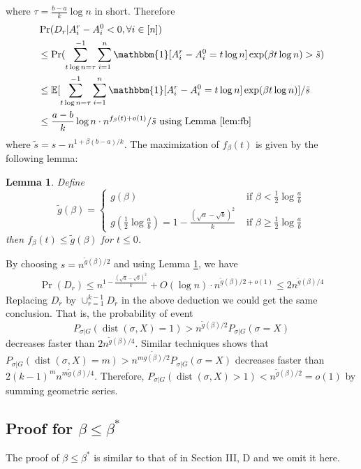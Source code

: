 \documentclass[conference]{IEEEtran}
\newtheorem{lemma}{Lemma}
\DeclareMathOperator{\dist}{dist}
\begin{document}
	where $\tau =\frac{b-a}{k}\log n$ in short. Therefore
	\begin{align*}
	&\Pr(D_r | A_i^r - A_i^0  < 0, \forall i\in [n])  \\
	&\leq\Pr(\sum_{t\log n =\tau}^{-1}\sum_{i=1}^n \mathbbm{1}[A^r_i - A^0_i = t\log n]\exp ( \beta  t\log n)  > \tilde{s} ) \\
	& \leq \mathbb{E}[\sum_{t\log n =\tau}^{-1}\sum_{i=1}^n \mathbbm{1}[A^r_i - A^0_i= t\log n]\exp ( \beta  t\log n)] /  \tilde{s} \\
	& \leq \frac{a-b}{k}\log n \cdot n^{f_{\beta}(t) + o(1)} / \tilde{s} \textrm{ using Lemma \ref{lem:fb} }
	\end{align*}
	where $\tilde{s} = s - n^{1+\beta(b-a)/k}$. 
	The maximization of $f_{\beta}(t)$ is given by the following lemma:
	\begin{lemma}\label{lem:tilde_g}
		Define
		$$
		\tilde{g}(\beta) = \begin{cases}
		g(\beta)   & \text{~if~} \beta< \frac{1}{2}\log\frac{a}{b} \\
		g(\frac{1}{2} \log\frac{a}{b}) = 1 - \frac{(\sqrt{a}-\sqrt{b})^2}{k} & \text{~if~} \beta\ge \frac{1}{2}\log\frac{a}{b}
		\end{cases}
		$$
		then $f_{\beta}(t) \leq \tilde{g}(\beta)$ for $t\leq 0$.
	\end{lemma}
	By choosing $s = n^{\tilde{g}(\beta)/2}$ and using Lemma \ref{lem:tilde_g}, we have
	\begin{align*}
	\Pr( D_r) \leq  n^{1-\frac{(\sqrt{a}-\sqrt{b})^2}{k}} + O(\log n)  \cdot n^{\tilde{g}(\beta)/2 + o(1)} \leq 2n^{\tilde{g}(\beta)/4}
	\end{align*}
	Replacing $D_r$ by $\cup_{r=1}^{k-1} D_r$ in the above deduction we could get the same conclusion.
	That is, the probability of event
	$$
	P_{\sigma | G}(\dist(\sigma, X) = 1) > n^{\tilde{g}(\beta)/2}P_{\sigma | G}(\sigma = X)\label{eq:betastar_xx}
	$$
	decreases faster than $2n^{\tilde{g}(\beta)/4}$.
	Similar techniques shows that $P_{\sigma | G}(\dist(\sigma, X) = m)> n^{m\tilde{g(\beta)}/2}P_{\sigma | G}(\sigma = X)$
	decreases faster than $2(k-1)^m n^{m\tilde{g}(\beta)/4}$. Therefore, $P_{\sigma | G}(\dist(\sigma, X) > 1) < n^{\tilde{g}(\beta)/2} = o(1)$ by summing geometric series.
	
	\subsection{Proof for $\beta\le\beta^\ast$}\label{subsect:smaller}
	The proof of $\beta\le\beta^\ast$ is similar to that of \cite{ye2020exact} in Section III, D and we omit it here.
	
\end{document}
